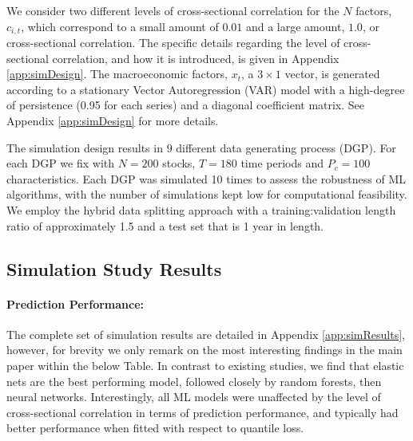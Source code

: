 \documentclass{article}
\begin{document}
We consider two different levels of cross-sectional correlation for the $N$ factors, $c_{i,t}$, which correspond to a small amount of $0.01$ and a large amount, $1.0$, or cross-sectional correlation. The specific details regarding the level of cross-sectional correlation, and how it is introduced, is given in Appendix \ref{app:simDesign}. The macroeconomic factors, $x_t$, a $3 \times 1$ vector, is generated according to a stationary Vector Autoregression (VAR) model with a high-degree of persistence (0.95 for each series) and a diagonal coefficient matrix. See Appendix \ref{app:simDesign} for more details.  

The simulation design results in $9$ different data generating process (DGP). For each DGP we fix with $N = 200$ stocks, $T = 180$ time periods and $P_c = 100$ characteristics. Each DGP was simulated 10 times to assess the robustness of ML algorithms, with the number of simulations kept low for computational feasibility. We employ the hybrid data splitting approach with a training:validation length ratio of approximately 1.5 and a test set that is 1 year in length. 


\subsection{Simulation Study Results}\label{sec:sims} 

\paragraph{Prediction Performance:}
The complete set of simulation results are detailed in Appendix \ref{app:simResults}, however, for brevity we only remark on the most interesting findings in the main paper within the below Table. In contrast to existing studies, we find that elastic nets are the best performing model, followed closely by random forests, then neural networks. Interestingly, all ML models were unaffected by the level of cross-sectional correlation in terms of prediction performance, and typically had better performance when fitted with respect to quantile loss. %
\end{document}
